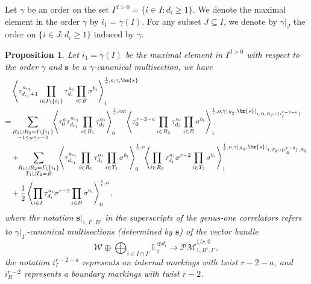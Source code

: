 \documentclass[11pt]{amsart}
\newtheorem{prop}[dummy]{Proposition}
\theoremstyle{definition}
\theoremstyle{remark}
\newcommand{\consta}{{\frac{1}{2}}}
\newcommand{\oPMb}{{\overline{\mathcal{PM}}}}
\newcommand{\<}{\left<}
\renewcommand{\>}{\right>}
\numberwithin{equation}{section}
\begin{document}
Let %
$\gamma$ be an order on the set $I^{d>0}=\{i\in I\colon d_i\ge 1\}$. We denote the maximal element in the order $\gamma$ by $i_1=\gamma(I)$. For any subset $J\subseteq I$, we denote by $\gamma\vert_J$ the order on $\{i\in J\colon d_i\ge 1\}$ induced by $\gamma$.
\begin{prop}\label{prop trr g=1 ordered}
Let $i_1=\gamma(I)$ be the maximal element in $I^{d>0}$ with respect to the order $\gamma$ and $\mathbf{s}$ be a $\gamma$-canonical multisection, we %
have
\begin{equation}\label{eq trr g=1 ordered}
\begin{split}
&\left\langle \tau_{d_{i_1}+1}^{a_{i_1}}\prod_{i\in I\setminus \{i_1\}}\tau^{a_i}_{d_i}\prod_{i\in B}\sigma^{b_i}\right\rangle^{\frac{1}{r},o,\gamma,\bm{s}}_1\hspace{-0.2cm}\\
=&\sum_{\substack{R_1 \sqcup R_2 = I\setminus\{i_1\}\\ -1\le a \le r-2}}\hspace{-0.1cm}\left\langle \tau_0^{a}\tau_{d_{i_1}}^{a_{i_1}}\prod_{i \in R_1}\tau_{d_i}^{a_i}\right\rangle^{\frac{1}{r},\text{ext}}_0
\hspace{-0.1cm}\left\langle \tau_0^{r-2-a}\prod_{i\in R_2}\tau^{a_i}_{d_i}\prod_{i\in B}\sigma^{b_i}\right\rangle^{\frac{1}{r},o,\gamma\vert_{R_2},\bm{s}\vert_{1,B,R_2\sqcup\{i^{r-2-a}_I\}}}_1\\
&+\hspace{-0.1cm}\sum_{\substack{R_1 \sqcup R_2 =  I\setminus\{i_1\} \\ T_1 \sqcup T_2 =  B}} \hspace{-0.1cm} \left\langle \tau^{a_{i_1}}_{d_{i_1}}\prod_{i \in R_1} \tau^{a_i}_{d_i}\prod_{i\in T_1}\sigma^{b_i}\right\rangle^{\frac{1}{r},o}_0 \hspace{-0.1cm}\left\langle \prod_{i \in R_2} \tau^{a_i}_{d_i} \sigma^{r-2}\prod_{i\in T_2}\sigma^{b_i}\right\rangle^{\frac{1}{r}, o,\gamma\vert_{R_2},\bm{s}\vert_{1,T_2\sqcup\{i^{r-2}_B\},R_2}}_1\\
&+\consta\left\langle \prod_{i\in I}\tau^{a_i}_{d_i}\sigma^{r-2}\prod_{i\in B}\sigma^{b_i}\right\rangle^{\frac{1}{r},o}_0,
    \end{split}
\end{equation}   
where %
the notation $\bm{s}\vert_{1,I',B'}$ in the superscripts of the genus-one correlators refers to $\gamma\vert_{I'}$-canonical multisections (determined by $\bm{s}$) of the vector bundle
$$\mathcal W\oplus \bigoplus_{i\in I\cap I'} \mathbb L_i^{\oplus d_i}\to \oPMb^{1/r,0}_{1,B',I'},$$
the notation $i^{r-2-a}_I$ represents an internal markings with twist $r-2-a$, and $i^{r-2}_B$ represents a boundary markings with twist $r-2$.

\end{prop}
\end{document}
